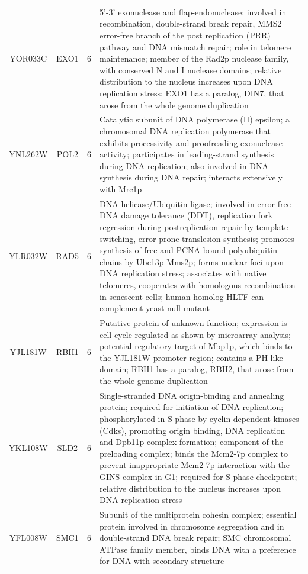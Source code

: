 \documentclass[]{article}
\begin{document}
\begin{longtable}{@{\extracolsep{3pt}} cccp{85mm}}
YOR033C & EXO1 & 6 & 5'-3' exonuclease and flap-endonuclease; involved in recombination, double-strand break repair, MMS2 error-free branch of the post replication (PRR) pathway and DNA mismatch repair; role in telomere maintenance; member of the Rad2p nuclease family, with conserved N and I nuclease domains; relative distribution to the nucleus increases upon DNA replication stress; EXO1 has a paralog, DIN7, that arose from the whole genome duplication \\ 
YNL262W & POL2 & 6 & Catalytic subunit of DNA polymerase (II) epsilon; a chromosomal DNA replication polymerase that exhibits processivity and proofreading exonuclease activity; participates in leading-strand synthesis during DNA replication; also involved in DNA synthesis during DNA repair; interacts extensively with Mrc1p \\ 
YLR032W & RAD5 & 6 & DNA helicase/Ubiquitin ligase; involved in error-free DNA damage tolerance (DDT), replication fork regression during postreplication repair by template switching, error-prone translesion synthesis; promotes synthesis of free and PCNA-bound polyubiquitin chains by Ubc13p-Mms2p; forms nuclear foci upon DNA replication stress; associates with native telomeres, cooperates with homologous recombination in senescent cells; human homolog HLTF can complement yeast null mutant \\ 
YJL181W & RBH1 & 6 & Putative protein of unknown function; expression is cell-cycle regulated as shown by microarray analysis; potential regulatory target of Mbp1p, which binds to the YJL181W promoter region; contains a PH-like domain; RBH1 has a paralog, RBH2, that arose from the whole genome duplication \\ 
YKL108W & SLD2 & 6 & Single-stranded DNA origin-binding and annealing protein; required for initiation of DNA replication; phosphorylated in S phase by cyclin-dependent kinases (Cdks), promoting origin binding, DNA replication and Dpb11p complex formation; component of the preloading complex; binds the Mcm2-7p complex to prevent inappropriate Mcm2-7p interaction with the GINS complex in G1; required for S phase checkpoint; relative distribution to the nucleus increases upon DNA replication stress \\ 
YFL008W & SMC1 & 6 & Subunit of the multiprotein cohesin complex; essential protein involved in chromosome segregation and in double-strand DNA break repair; SMC chromosomal ATPase family member, binds DNA with a preference for DNA with secondary structure \\ 

\end{longtable}
\end{document}
